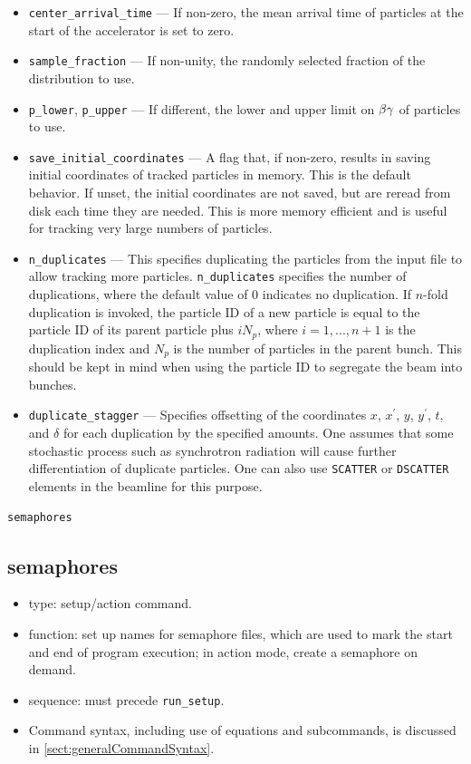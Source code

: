\documentclass[11pt]{article}
\begin{document}
\begin{itemize}
\item \verb|center_arrival_time| --- If non-zero, the mean arrival time of particles at the start of the
accelerator is set to zero.
\item \verb|sample_fraction| --- If non-unity, the randomly selected fraction of the distribution to use.
\item \verb|p_lower|, \verb|p_upper| --- If different, the lower and upper limit on ${\rm \beta\gamma}$ of particles to use.
\item \verb|save_initial_coordinates| --- A flag that, if non-zero, results in saving initial coordinates
of tracked particles in memory.  This is the default behavior.  If unset, the initial coordinates
are not saved, but are reread from disk each time they are needed.  This is more memory efficient
and is useful for tracking very large numbers of particles.
\item \verb|n_duplicates| --- This specifies duplicating the particles from the input file to allow tracking more
  particles.   \verb|n_duplicates| specifies the number of duplications, where the default value of 0 indicates no duplication.
  If $n$-fold duplication is invoked, the particle ID of a new particle is equal to the particle ID of its parent particle plus
  $i N_p$, where $i=1,...,n+1$ is the duplication index and $N_p$ is the number of particles in the parent bunch.
  This should be kept in mind when using the particle ID to segregate the beam into bunches.
\item \verb|duplicate_stagger| --- Specifies offsetting of the coordinates $x$, $x^\prime$, $y$, $y^\prime$, $t$, and $\delta$
  for each duplication by the specified amounts.
  One assumes that some stochastic process such as synchrotron radiation will cause further differentiation of duplicate particles.
  One can also use \verb|SCATTER| or \verb|DSCATTER| elements in the beamline for this purpose.
\end{itemize}

\newpage
\begin{center}{\Large\verb|semaphores|}\end{center}
\subsection{semaphores \label{subsec:semaphores}}

\begin{itemize}
\item type: setup/action command.
\item function: set up names for semaphore files, which are used to mark the
        start and end of program execution; in action mode, create a semaphore on demand.
\item sequence: must precede \verb|run_setup|.
\item Command syntax, including use of equations and subcommands, is discussed in \ref{sect:generalCommandSyntax}.
\end{itemize}
\end{document}
